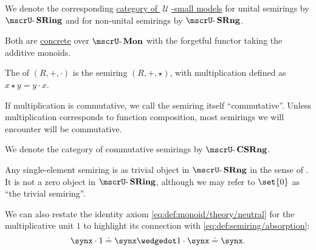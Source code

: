 \begin{definition}
\begin{thmenum}
     We denote the corresponding \hyperref[def:category_of_small_first_order_models]{category of \( \mscrU \)-small models} for unital semirings by \( \ucat{SRing} \) and for non-unital semirings by \( \ucat{SRng} \).

    Both are \hyperref[def:concrete_category]{concrete} over \hyperref[def:monoid/category]{\( \ucat{Mon} \)} with the forgetful functor taking the additive monoids.

     The  of \( (R, +, \cdot) \) is the semiring \( (R, +, \star) \), with multiplication defined as \( x \star y = y \cdot x \).

     If multiplication is commutative, we call the semiring itself \enquote{commutative}. Unless multiplication corresponds to function composition, most semirings we will encounter will be commutative.

    We denote the category of commutative semirings by \( \ucat{CSRng} \).

     Any single-element semiring is as trivial object in \( \ucat{SRng} \) in the sense of . It is not a zero object in \( \ucat{SRing} \), although we may refer to \( \set{ 0 } \) as \enquote{the trivial semiring}.
  \end{thmenum}
\end{definition}
\begin{comments}
  \item We can also restate the identity axiom \eqref{eq:def:monoid/theory/neutral} for the multiplicative unit \( 1 \) to highlight its connection with \eqref{eq:def:semiring/absorption}:
  \begin{equation}\label{eq:def:semiring/identity}
    \synx \cdot 1 \syneq \synx \synwedge 1 \cdot \synx \syneq \synx.
  \end{equation}
\end{comments}

